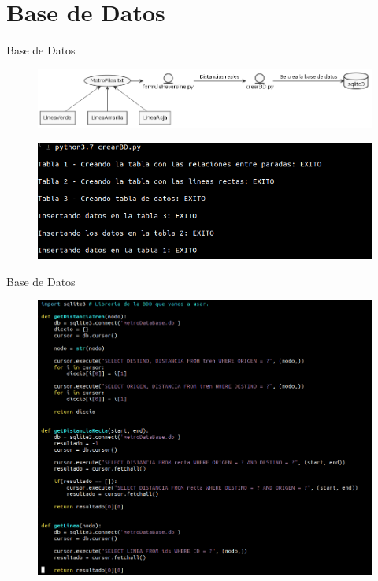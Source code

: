 \documentclass{beamer}
\begin{document}
\section{Base de Datos}
\begin{frame}{Base de Datos}
  \begin{figure}[H]
    \centering
    \includegraphics[scale=0.35]{"../pics/umlBDD"}
  \end{figure}
  \vspace{0.3cm}
  \begin{figure}[H]
    \centering
    \includegraphics[scale=0.37]{"../pics/printBDD"}
  \end{figure}
\end{frame}

\begin{frame}{Base de Datos}
  \begin{figure}[H]
    \centering
    \includegraphics[scale=0.30]{"../pics/querys"}
  \end{figure}
\end{frame}
\end{document}
